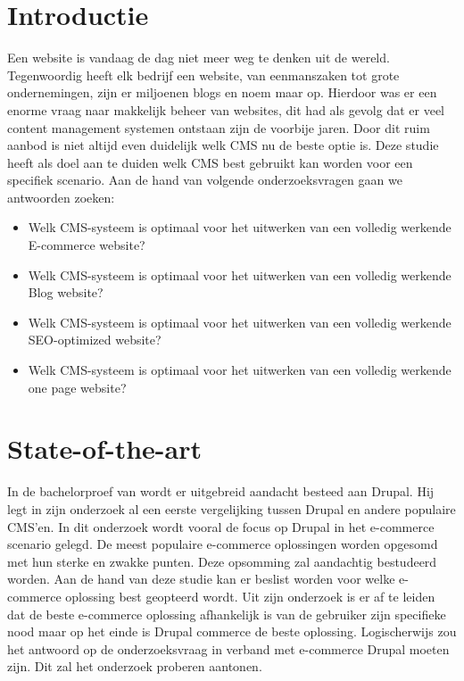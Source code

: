 
\section{Introductie} %
\label{sec:introductie}

Een website is vandaag de dag niet meer weg te denken uit de wereld. Tegenwoordig heeft elk bedrijf een website, van eenmanszaken tot grote ondernemingen, zijn er miljoenen blogs en noem maar op. Hierdoor was er een enorme vraag naar makkelijk beheer van websites, dit had als gevolg dat er veel content management systemen ontstaan zijn de voorbije jaren. Door dit ruim aanbod is niet altijd even duidelijk welk CMS nu de beste optie is. Deze studie heeft als doel aan te duiden welk CMS best gebruikt kan worden voor een specifiek scenario. Aan de hand van volgende onderzoeksvragen gaan we antwoorden zoeken:
\begin{itemize}
	\item Welk CMS-systeem is optimaal voor het uitwerken van een volledig werkende E-commerce website?
	\item Welk CMS-systeem is optimaal voor het uitwerken van een volledig werkende Blog website?
	\item Welk CMS-systeem is optimaal voor het uitwerken van een volledig werkende SEO-optimized website?
	\item Welk CMS-systeem is optimaal voor het uitwerken van een volledig werkende one page website?
\end{itemize}


\section{State-of-the-art}
\label{sec:state-of-the-art}

In de bachelorproef van \textcite{VanCrombrugge2015-2016} wordt er uitgebreid aandacht besteed aan Drupal. Hij legt in zijn onderzoek al een eerste vergelijking tussen Drupal en andere populaire CMS'en. In dit onderzoek wordt vooral de focus op Drupal in het e-commerce scenario gelegd. De meest populaire e-commerce oplossingen worden opgesomd met hun sterke en zwakke punten. Deze opsomming zal aandachtig bestudeerd worden. Aan de hand van deze studie kan er beslist worden voor welke e-commerce oplossing best geopteerd wordt. Uit zijn onderzoek is er af te leiden dat de beste e-commerce oplossing afhankelijk is van de gebruiker zijn specifieke nood maar op het einde is Drupal commerce de beste oplossing. Logischerwijs zou het antwoord op de onderzoeksvraag in verband met e-commerce Drupal moeten zijn. Dit zal het onderzoek proberen aantonen.

